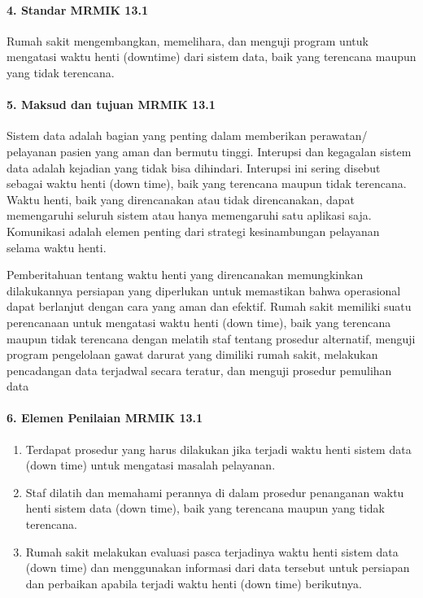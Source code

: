 \documentclass[
]{book}
\providecommand{\tightlist}{%
  \setlength{\itemsep}{0pt}\setlength{\parskip}{0pt}}
\begin{document}
\hypertarget{standar-mrmik-13.1}{%
\paragraph*{4. Standar MRMIK 13.1}\label{standar-mrmik-13.1}}

Rumah sakit mengembangkan, memelihara, dan menguji program untuk mengatasi waktu henti (downtime) dari sistem data, baik yang terencana maupun yang tidak terencana.

\hypertarget{maksud-dan-tujuan-mrmik-13.1}{%
\paragraph*{5. Maksud dan tujuan MRMIK 13.1}\label{maksud-dan-tujuan-mrmik-13.1}}

Sistem data adalah bagian yang penting dalam memberikan perawatan/ pelayanan pasien yang aman dan bermutu tinggi. Interupsi dan kegagalan sistem data adalah kejadian yang tidak bisa dihindari. Interupsi ini sering disebut sebagai waktu henti (down time), baik yang terencana maupun tidak terencana. Waktu henti, baik yang direncanakan atau tidak direncanakan, dapat memengaruhi seluruh sistem atau hanya memengaruhi satu aplikasi saja. Komunikasi adalah elemen penting dari strategi kesinambungan pelayanan selama waktu henti.

Pemberitahuan tentang waktu henti yang direncanakan memungkinkan dilakukannya persiapan yang diperlukan untuk memastikan bahwa operasional dapat berlanjut dengan cara yang aman dan efektif. Rumah sakit memiliki suatu perencanaan untuk mengatasi waktu henti (down time), baik yang terencana maupun tidak terencana dengan melatih staf tentang prosedur alternatif, menguji program pengelolaan gawat darurat yang dimiliki rumah sakit, melakukan pencadangan data terjadwal secara teratur, dan menguji prosedur pemulihan data

\hypertarget{elemen-penilaian-mrmik-13.1}{%
\paragraph*{6. Elemen Penilaian MRMIK 13.1}\label{elemen-penilaian-mrmik-13.1}}

\begin{enumerate}
\def\labelenumi{\alph{enumi}.}
\tightlist
\item
  Terdapat prosedur yang harus dilakukan jika terjadi waktu henti sistem data (down time) untuk mengatasi masalah pelayanan.
\item
  Staf dilatih dan memahami perannya di dalam prosedur penanganan waktu henti sistem data (down time), baik yang terencana maupun yang tidak terencana.
\item
  Rumah sakit melakukan evaluasi pasca terjadinya waktu henti sistem data (down time) dan menggunakan informasi dari data tersebut untuk persiapan dan perbaikan apabila terjadi waktu henti (down time) berikutnya.
\end{enumerate}
\end{document}
